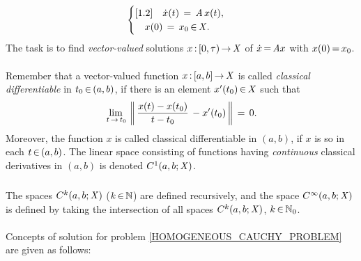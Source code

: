 \documentclass[11pt,twoside]{article}
\begin{document}
\begin{equation}\label{HOMOGENEOUS_CAUCHY_PROBLEM}
\begin{cases}[1.2]
\quad \dot{x}(t) \,=\, \mathit{A} \, x(t),\\
\quad x(0) \,=\, x_0 {\,\in\,} \mathit{X}.\\
\end{cases}
\end{equation}
The task is to find \textit{vector-valued} solutions $x {\,:\,} [0,\tau) {\,\to\,} \mathit{X}$
of $\dot{x} {\,=\,} \mathit{A} x$ with $x(0) {\,=\,} x_0$.

\paragraph{} %
Remember that a vector-valued function $x {\,:\,} [a,b] {\,\to\,} \mathit{X}$
is called \textit{classical differentiable} in $t_0 {\,\in\,} (a,b)$,
if there is an element $x'(t_0) {\,\in\,} \mathit{X}$ such that
\[
\lim_{\,t {\,\to\,} t_0} \,
\left\lVert  \, \frac{x(t)-x(t_0)}{t-t_0}\, - x'(t_0) \,  \right\rVert \,=\, 0.
\]
Moreover,
the function $x$ is called {classical differentiable in} $(a,b)$,
if $x$ is so in each $t {\,\in\,} (a,b)$.
The linear space consisting of functions having \textit{continuous}
classical derivatives in $(a,b)$ is denoted $C^1(a,b;\mathit{X})$.

\subparagraph{} %
The spaces $C^k(a,b;\mathit{X})$ ($k {\,\in\,} {\mathbb{N}}$) are defined recursively,
and the space $C^{\infty}(a,b;\mathit{X})$ is defined
by taking the intersection of all spaces $C^k(a,b;\mathit{X})$,
$k {\,\in\,} {\mathbb{N}}_0$.

\paragraph{} %
Concepts of solution for problem \eqref{HOMOGENEOUS_CAUCHY_PROBLEM}
are given as follows:
\end{document}
